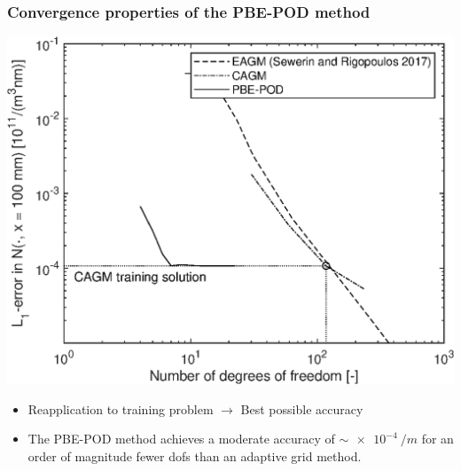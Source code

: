 \documentclass[10pt,xcolor=dvipsnames]{beamer}
\newcommand*{\itemskip}{0.25\baselineskip}
\begin{document}

\begin{frame}[t]
  
  \frametitle{Convergence properties of the PBE-POD method}
  
  \begin{center}
  \includegraphics[width=0.65\columnwidth,clip]{fig/plugflow_convergence.eps}
  \end{center}
  
  \begin{itemize}
  \vspace{\itemskip}
  \item Reapplication to training problem $\longrightarrow$ Best possible accuracy
  \vspace{\itemskip}
  \item The PBE-POD method achieves a moderate accuracy of $\sim\SI{e-4}{/m}$ for an order of magnitude fewer dofs than an adaptive grid method.
  \end{itemize}

\end{frame}

\end{document}
